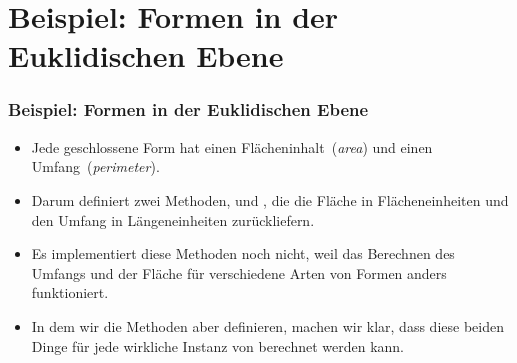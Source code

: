 \documentclass[aspectratio=169,mathserif,notheorems]{beamer}%
\begin{document}
\section{Beispiel: Formen in der Euklidischen Ebene}%
%
\begin{frame}[t]%
\frametitle{Beispiel: Formen in der Euklidischen Ebene}%
%
\begin{itemize}%
%
%
%
%
\item<3-> Jede geschlossene Form hat einen Flächeninhalt~(\emph{area}) und einen Umfang~(\emph{perimeter}).%
%
\item<4-> Darum definiert  zwei Methoden,  und , die die Fläche in Flächeneinheiten und den Umfang in Längeneinheiten zurückliefern.%
%
\item<5-> Es implementiert diese Methoden noch nicht, weil das Berechnen des Umfangs und der Fläche für verschiedene Arten von Formen anders funktioniert.%
%
\item<6-> In dem wir die Methoden aber definieren, machen wir klar, dass diese beiden Dinge für jede wirkliche Instanz von  berechnet werden kann.%
%
\end{itemize}%
%
%
\end{frame}%
%
\end{document}
